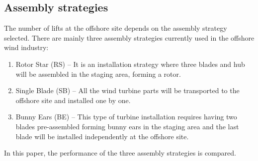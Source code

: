 \subsection{Assembly strategies}
The number of lifts at the offshore site depends on the assembly strategy selected. There are mainly three assembly strategies currently used in the offshore wind industry:

\begin{enumerate}
\item Rotor Star (RS) -- It is an installation strategy where three blades and hub will be assembled in the staging area, forming a rotor.
\item Single Blade (SB) -- All the wind turbine parts will be transported to the offshore site and installed one by one.
\item Bunny Ears (BE) -- This type of turbine installation requires having two blades pre-assembled forming bunny ears in the staging area and the last blade will be installed independently at the offshore site.
\end{enumerate}

In this paper, the performance of the three assembly strategies is compared.